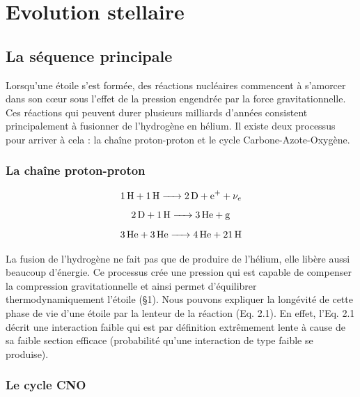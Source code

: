 

	
\chapter{Evolution stellaire}

\section{La séquence principale}

Lorsqu’une étoile s’est formée, des réactions nucléaires commencent à s’amorcer dans son cœur sous l’effet de la pression engendrée par la force gravitationnelle. Ces réactions qui peuvent durer plusieurs milliards d’années consistent principalement à fusionner de l’hydrogène en hélium. Il existe deux processus pour arriver à cela : la chaîne proton-proton et le cycle Carbone-Azote-Oxygène.\bigskip

\subsection{La chaîne proton-proton}

\begin{center}
	\begin{equation}\ce{\ce{1H} + \ce{1H} -> \ce{2D} + \ce{e+} + $\nu_{e}$}\end{equation}
	\begin{equation}\ce{\ce{2D} + \ce{1H} -> \ce{3He} + g}\end{equation}
	\begin{equation}\ce{\ce{3He} + \ce{3He} -> \ce{4He} + \ce{21H}}\end{equation}	
\end{center}\bigskip

La fusion de l’hydrogène ne fait pas que de produire de l’hélium, elle libère aussi beaucoup d’énergie. Ce processus crée une pression qui est capable de compenser la compression gravitationnelle et ainsi permet d’équilibrer thermodynamiquement l’étoile (§1).
Nous pouvons expliquer la longévité de cette phase de vie d’une étoile par la lenteur de la réaction (Eq. 2.1). En effet, l’Eq. 2.1 décrit une interaction faible qui est par définition extrêmement lente à cause de sa faible section efficace (probabilité qu’une interaction de type faible se produise).\bigskip

\subsection{Le cycle CNO}\medskip

